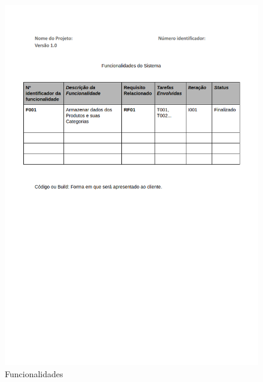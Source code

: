 \documentclass[	DIV=calc,%
							paper=a4,%
							fontsize=12pt,%
							onecolumn]{scrartcl}	 					%
\begin{document}
\begin{figure}
	\centering
	\includegraphics[width=\textwidth]{6.png}
	\caption{Funcionalidades}
	\label{Figura 8}
\end{figure}
\end{document}
